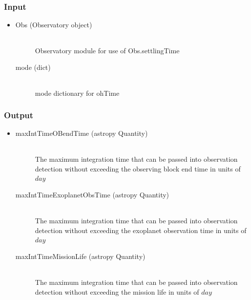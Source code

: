 \documentclass[cleanfoot]{asme2ej}
\begin{document}
\subsubsection*{Input}
\begin{itemize}
\item 
\begin{description}
    \item[Obs (Observatory object)] \hfill \\ Observatory module for use of Obs.settlingTime
    \item[mode (dict)] \hfill \\ mode dictionary for ohTime
\end{description}
\end{itemize}
\subsubsection*{Output}
\begin{itemize}
\item 
\begin{description}
    \item[maxIntTimeOBendTime (astropy Quantity)] \hfill \\ The maximum integration time that can be passed into observation detection without exceeding the observing block end time in units of $day$
    \item[maxIntTimeExoplanetObsTime (astropy Quantity)] \hfill \\ The maximum integration time that can be passed into observation detection without exceeding the exoplanet observation time in units of $day$
    \item[maxIntTimeMissionLife (astropy Quantity)] \hfill \\ The maximum integration time that can be passed into observation detection without exceeding the mission life in units of $day$
\end{description}
\end{itemize}
\end{document}
